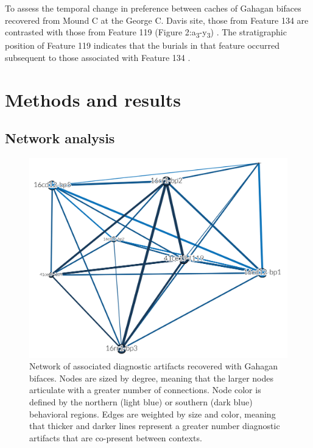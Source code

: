\documentclass[]{interact}
\theoremstyle{plain}%
\theoremstyle{definition}
\theoremstyle{remark}
\begin{document}
To assess the temporal change in preference between caches of Gahagan
bifaces recovered from Mound C at the George C. Davis site, those from
Feature 134 are contrasted with those from Feature 119 (Figure
2:a\textsubscript{3}-y\textsubscript{3}) \citep{RN5746, RN8186}. The
stratigraphic position of Feature 119 indicates that the burials in that
feature occurred subsequent to those associated with Feature 134
\citep{RN5746, RN8186}.

\hypertarget{methods-and-results}{%
\section{Methods and results}\label{methods-and-results}}

\hypertarget{network-analysis}{%
\subsection{Network analysis}\label{network-analysis}}

\begin{figure}

{\centering \includegraphics[width=0.8\linewidth]{img/fig04} 

}

\caption{Network of associated diagnostic artifacts recovered with Gahagan bifaces. Nodes are sized by degree, meaning that the larger nodes articulate with a greater number of connections. Node color is defined by the northern (light blue) or southern (dark blue) behavioral regions. Edges are weighted by size and color, meaning that thicker and darker lines represent a greater number diagnostic artifacts that are co-present between contexts.}\label{fig:associated.net}
\end{figure}
\end{document}
